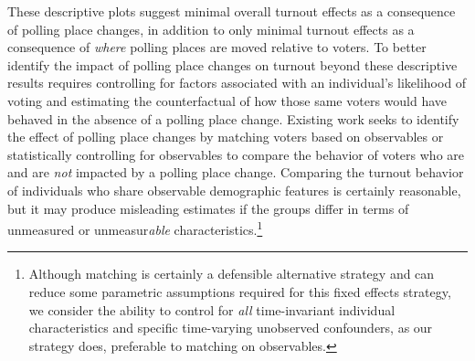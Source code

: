 \documentclass{cup_PSRM}
\begin{document}
These descriptive plots suggest minimal overall turnout effects as a consequence of polling place changes, in addition to only minimal turnout effects as a consequence of \emph{where} polling places are moved relative to voters. To better identify the impact of polling place changes on turnout beyond these descriptive results requires controlling for factors associated with an individual's likelihood of voting and estimating the counterfactual of how those same voters would have behaved in the absence of a polling place change.  Existing work seeks to identify the effect of polling place changes by matching voters based on observables \citep{brady2011turning} or statistically controlling for observables \citep{amos2017reprecincting} to compare the behavior of voters who are and are \emph{not} impacted by a polling place change.  Comparing the turnout behavior of individuals who share observable demographic features is certainly reasonable, but it may produce misleading estimates if the groups differ in terms of unmeasured or unmeasur\emph{able} characteristics.\footnote{Although matching is certainly a defensible alternative strategy and can reduce some parametric assumptions required for this fixed effects strategy, we consider the ability to control for \emph{all} time-invariant individual characteristics and specific time-varying unobserved confounders, as our strategy does, preferable to matching on observables.  }  %
\end{document}
